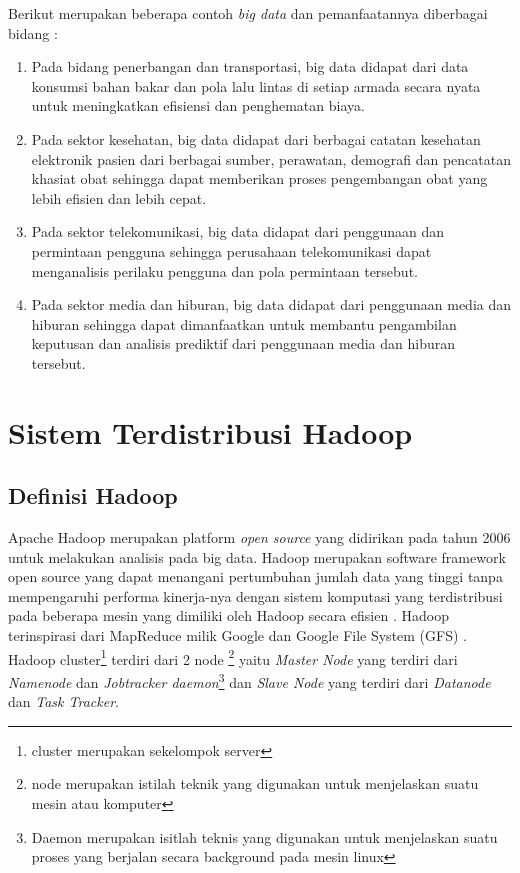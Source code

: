 Berikut merupakan beberapa contoh \textit{big data} dan pemanfaatannya diberbagai bidang \cite{JNetwork2012introductionBigData}:
\begin{enumerate}
	\item Pada bidang penerbangan dan transportasi, big data didapat dari data konsumsi bahan bakar dan pola lalu lintas di setiap armada secara nyata untuk meningkatkan efisiensi dan penghematan biaya.
	\item Pada sektor kesehatan, big data didapat dari berbagai catatan kesehatan elektronik pasien dari berbagai sumber, perawatan, demografi dan pencatatan khasiat obat sehingga dapat memberikan proses pengembangan obat yang lebih efisien dan lebih cepat.
	\item Pada sektor telekomunikasi, big data didapat dari penggunaan dan permintaan pengguna sehingga perusahaan telekomunikasi dapat menganalisis perilaku pengguna dan pola permintaan tersebut.
	\item Pada sektor media dan hiburan, big data didapat dari penggunaan media dan hiburan sehingga dapat dimanfaatkan untuk membantu pengambilan keputusan dan analisis prediktif dari penggunaan media dan hiburan tersebut.
\end{enumerate}


\section{Sistem Terdistribusi Hadoop}
	\subsection{Definisi Hadoop}
	Apache Hadoop merupakan platform \textit{open source} yang didirikan pada tahun 2006 untuk melakukan analisis pada big data. Hadoop merupakan software framework open source yang dapat menangani pertumbuhan jumlah data yang tinggi tanpa mempengaruhi performa kinerja-nya dengan sistem komputasi yang terdistribusi pada beberapa mesin yang dimiliki oleh Hadoop secara efisien \cite{Lam:2010:HA:1965594}. Hadoop terinspirasi dari MapReduce milik Google\cite{GoogleMR:2004} dan Google File System (GFS) \cite{GFS:2003}. \\
	Hadoop cluster\footnote{cluster merupakan sekelompok server} terdiri dari 2 node \footnote{node merupakan istilah teknik yang digunakan untuk menjelaskan suatu mesin atau komputer} yaitu \textit{Master Node} yang terdiri dari \textit{Namenode} dan \textit{Jobtracker daemon}\footnote{Daemon merupakan isitlah teknis yang digunakan untuk menjelaskan suatu proses yang berjalan secara background pada mesin linux} dan \textit{Slave Node} yang terdiri dari \textit{Datanode} dan \textit{Task Tracker}.
	
